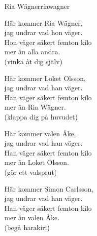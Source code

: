 \begin{song}{Ria Wägner}{riawagner}
\begin{vers}
Här kommer Ria Wägner,\\
jag undrar vad hon väger.\\
Hon väger säkert femton kilo\\
mer än alla andra.\\
(vinka åt dig själv)\\
\end{vers}
\begin{vers}
Här kommer Loket Olsson,\\
jag undrar vad han väger.\\
Han väger säkert femton kilo\\
mer än Ria Wägner.\\
(klappa dig på huvudet)\\
\end{vers}
\begin{vers}
Här kommer valen Åke,\\
jag undrar vad han väger.\\
Han väger säkert femton kilo\\
mer än Loket Olsson.\\
(gör ett valsprut)\\
\end{vers}
\begin{vers}
Här kommer Simon Carlsson,\\
jag undrar vad han väger.\\
Han väger säkert femton kilo\\
mer än valen Åke.\\
(begå harakiri)
\end{vers}
\end{song}
